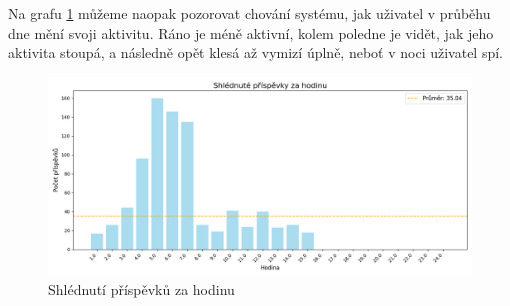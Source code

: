 \documentclass[11pt, a4paper]{article}
\begin{document}
\newpage
Na grafu \ref{fig:Shlédnuté_příspěvky_za_hodinu} můžeme naopak pozorovat chování systému, jak uživatel v průběhu dne mění svoji aktivitu.
Ráno je méně aktivní, kolem poledne je vidět, jak jeho aktivita stoupá, a následně opět klesá až vymizí úplně, neboť v noci uživatel spí.

\begin{figure}[h]
    \centering
    \includegraphics[width=\linewidth]{Shlédnuté_příspěvky_za_hodinu.png}
    \caption{Shlédnutí příspěvků za hodinu}
    \label{fig:Shlédnuté_příspěvky_za_hodinu}
\end{figure}
\end{document}

